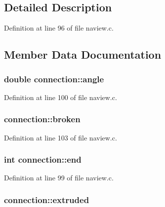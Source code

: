 \subsection{Detailed Description}


Definition at line 96 of file naview.\+c.



\subsection{Member Data Documentation}
\hypertarget{structconnection_a33fe62e9106d0de72fdffd1afa080257}{
\subsubsection[{angle}]{\setlength{\rightskip}{0pt plus 5cm}double connection\+::angle}}\label{structconnection_a33fe62e9106d0de72fdffd1afa080257}


Definition at line 100 of file naview.\+c.

\hypertarget{structconnection_a699addda10bad7552532d4f38aa00f1e}{
\subsubsection[{broken}]{ connection\+::broken}}\label{structconnection_a699addda10bad7552532d4f38aa00f1e}


Definition at line 103 of file naview.\+c.

\hypertarget{structconnection_a2eb3c7c7ea26ea070cd24284cb13baca}{
\subsubsection[{end}]{\setlength{\rightskip}{0pt plus 5cm}int connection\+::end}}\label{structconnection_a2eb3c7c7ea26ea070cd24284cb13baca}


Definition at line 99 of file naview.\+c.

\hypertarget{structconnection_ad108aaca045b991c8d6be924ada68fda}{
\subsubsection[{extruded}]{ connection\+::extruded}}\label{structconnection_ad108aaca045b991c8d6be924ada68fda}


